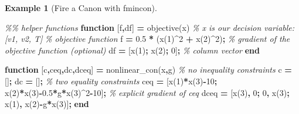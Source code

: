 \documentclass[
]{book}
\newenvironment{Shaded}{\begin{snugshade}}{\end{snugshade}}
\newcommand{\CommentTok}[1]{\textcolor[rgb]{0.56,0.35,0.01}{\textit{#1}}}
\newcommand{\FloatTok}[1]{\textcolor[rgb]{0.00,0.00,0.81}{#1}}
\newcommand{\KeywordTok}[1]{\textcolor[rgb]{0.13,0.29,0.53}{\textbf{#1}}}
\newcommand{\NormalTok}[1]{#1}
\newcommand{\OperatorTok}[1]{\textcolor[rgb]{0.81,0.36,0.00}{\textbf{#1}}}
\newcommand{\VariableTok}[1]{\textcolor[rgb]{0.00,0.00,0.00}{#1}}
\theoremstyle{definition}
\theoremstyle{definition}
\newtheorem{example}{Example}[chapter]
\theoremstyle{definition}
\theoremstyle{definition}
\theoremstyle{remark}
\begin{document}
\begin{example}[Fire a Canon with fmincon]
\begin{Shaded}
\begin{Highlighting}[]
\CommentTok{\%\% helper functions}
\KeywordTok{function}\NormalTok{ [}\VariableTok{f}\OperatorTok{,}\VariableTok{df}\NormalTok{] }\OperatorTok{=} \VariableTok{objective}\NormalTok{(}\VariableTok{x}\NormalTok{)}
\CommentTok{\% x is our decision variable: [v1, v2, T]}
\CommentTok{\% objective function}
\VariableTok{f} \OperatorTok{=} \FloatTok{0.5} \OperatorTok{*}\NormalTok{ (}\VariableTok{x}\NormalTok{(}\FloatTok{1}\NormalTok{)}\OperatorTok{\^{}}\FloatTok{2} \OperatorTok{+} \VariableTok{x}\NormalTok{(}\FloatTok{2}\NormalTok{)}\OperatorTok{\^{}}\FloatTok{2}\NormalTok{)}\OperatorTok{;}
\CommentTok{\% gradient of the objective function (optional)}
\VariableTok{df} \OperatorTok{=}\NormalTok{ [}\VariableTok{x}\NormalTok{(}\FloatTok{1}\NormalTok{)}\OperatorTok{;} \VariableTok{x}\NormalTok{(}\FloatTok{2}\NormalTok{)}\OperatorTok{;} \FloatTok{0}\NormalTok{]}\OperatorTok{;} \CommentTok{\% column vector}
\KeywordTok{end}

\KeywordTok{function}\NormalTok{ [}\VariableTok{c}\OperatorTok{,}\VariableTok{ceq}\OperatorTok{,}\VariableTok{dc}\OperatorTok{,}\VariableTok{dceq}\NormalTok{] }\OperatorTok{=} \VariableTok{nonlinear\_con}\NormalTok{(}\VariableTok{x}\OperatorTok{,}\VariableTok{g}\NormalTok{)}
\CommentTok{\% no inequality constraints}
\VariableTok{c} \OperatorTok{=}\NormalTok{ []}\OperatorTok{;} \VariableTok{dc} \OperatorTok{=}\NormalTok{ []}\OperatorTok{;}
\CommentTok{\% two equality constraints}
\VariableTok{ceq} \OperatorTok{=}\NormalTok{ [}\VariableTok{x}\NormalTok{(}\FloatTok{1}\NormalTok{)}\OperatorTok{*}\VariableTok{x}\NormalTok{(}\FloatTok{3}\NormalTok{)}\OperatorTok{{-}}\FloatTok{10}\OperatorTok{;}
       \VariableTok{x}\NormalTok{(}\FloatTok{2}\NormalTok{)}\OperatorTok{*}\VariableTok{x}\NormalTok{(}\FloatTok{3}\NormalTok{)}\OperatorTok{{-}}\FloatTok{0.5}\OperatorTok{*}\VariableTok{g}\OperatorTok{*}\VariableTok{x}\NormalTok{(}\FloatTok{3}\NormalTok{)}\OperatorTok{\^{}}\FloatTok{2}\OperatorTok{{-}}\FloatTok{10}\NormalTok{]}\OperatorTok{;}
\CommentTok{\% explicit gradient of ceq}
\VariableTok{dceq} \OperatorTok{=}\NormalTok{ [}\VariableTok{x}\NormalTok{(}\FloatTok{3}\NormalTok{)}\OperatorTok{,} \FloatTok{0}\OperatorTok{;}
        \FloatTok{0}\OperatorTok{,} \VariableTok{x}\NormalTok{(}\FloatTok{3}\NormalTok{)}\OperatorTok{;}
        \VariableTok{x}\NormalTok{(}\FloatTok{1}\NormalTok{)}\OperatorTok{,} \VariableTok{x}\NormalTok{(}\FloatTok{2}\NormalTok{)}\OperatorTok{{-}}\VariableTok{g}\OperatorTok{*}\VariableTok{x}\NormalTok{(}\FloatTok{3}\NormalTok{)]}\OperatorTok{;}
\KeywordTok{end}
\end{Highlighting}
\end{Shaded}


\end{example}
\end{document}
